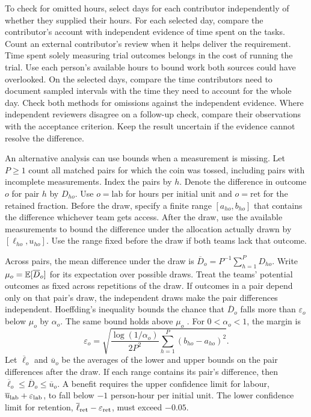 To check for omitted hours, select days for each contributor independently of whether they supplied their hours. For each selected day, compare the contributor's account with independent evidence of time spent on the tasks. Count an external contributor's review when it helps deliver the requirement. Time spent solely measuring trial outcomes belongs in the cost of running the trial. Use each person's available hours to bound work both sources could have overlooked. On the selected days, compare the time contributors need to document sampled intervals with the time they need to account for the whole day. Check both methods for omissions against the independent evidence. Where independent reviewers disagree on a follow-up check, compare their observations with the acceptance criterion. Keep the result uncertain if the evidence cannot resolve the difference.

An alternative analysis can use bounds when a measurement is missing. Let $P\ge 1$ count all matched pairs for which the coin was tossed, including pairs with incomplete measurements. Index the pairs by $h$. Denote the difference in outcome $o$ for pair $h$ by $D_{ho}$. Use $o=\mathrm{lab}$ for hours per initial unit and $o=\mathrm{ret}$ for the retained fraction. Before the draw, specify a finite range $[a_{ho},b_{ho}]$ that contains the difference whichever team gets access. After the draw, use the available measurements to bound the difference under the allocation actually drawn by $[\ell_{ho},u_{ho}]$. Use the range fixed before the draw if both teams lack that outcome.

Across pairs, the mean difference under the draw is $\overline D_o=P^{-1}\sum_{h=1}^{P}D_{ho}$. Write $\mu_o=\mathbb E[\overline D_o]$ for its expectation over possible draws. Treat the teams' potential outcomes as fixed across repetitions of the draw. If outcomes in a pair depend only on that pair's draw, the independent draws make the pair differences independent. Hoeffding's inequality bounds the chance that $\overline D_o$ falls more than $\varepsilon_o$ below $\mu_o$ by $\alpha_o$. The same bound holds above $\mu_o$ \cite{hoeffding1963}. For $0<\alpha_o<1$, the margin is
\[
\varepsilon_o=\sqrt{\frac{\log(1/\alpha_o)}{2P^2}
  \sum_{h=1}^{P}(b_{ho}-a_{ho})^2}.
\]
Let $\overline{\ell}_o$ and $\overline{u}_o$ be the averages of the lower and upper bounds on the pair differences after the draw. If each range contains its pair's difference, then $\overline{\ell}_o\le\overline D_o\le\overline{u}_o$. A benefit requires the upper confidence limit for labour, $\overline{u}_{\rm lab}+\varepsilon_{\rm lab}$, to fall below $-1$ person-hour per initial unit. The lower confidence limit for retention, $\overline{\ell}_{\rm ret}-\varepsilon_{\rm ret}$, must exceed $-0.05$.

